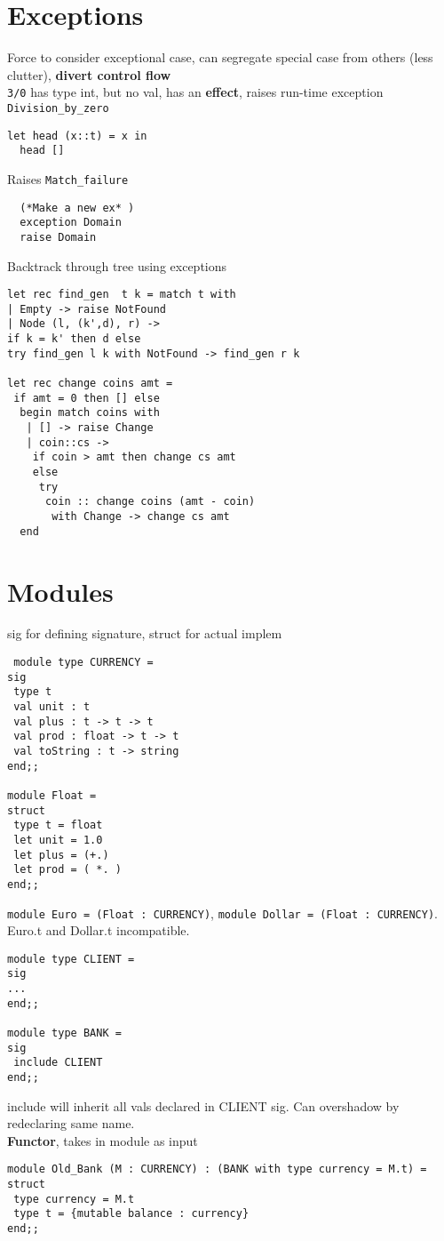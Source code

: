 \section{Exceptions}
Force to consider exceptional case, can segregate special case from
others (less clutter), \textbf{divert control flow}
\\ \texttt{3/0} has type int, but no val, has an \textbf{effect},
raises run-time exception \texttt{Division\_by\_zero}
\begin{lstlisting}
let head (x::t) = x in
  head []
\end{lstlisting}
Raises \texttt{Match\_failure}
\begin{lstlisting}
  (*Make a new ex* )
  exception Domain
  raise Domain
\end{lstlisting}
Backtrack through tree using exceptions
\begin{lstlisting}
let rec find_gen  t k = match t with
| Empty -> raise NotFound
| Node (l, (k',d), r) -> 
if k = k' then d else 
try find_gen l k with NotFound -> find_gen r k

let rec change coins amt = 
 if amt = 0 then [] else 
  begin match coins with 
   | [] -> raise Change
   | coin::cs ->
    if coin > amt then change cs amt
    else 
     try 
      coin :: change coins (amt - coin)
       with Change -> change cs amt
  end
\end{lstlisting}
\color{Emerald}
\section{Modules}
sig for defining signature, struct for actual implem
\begin{lstlisting}
 module type CURRENCY = 
sig 
 type t 
 val unit : t 
 val plus : t -> t -> t 
 val prod : float -> t -> t 
 val toString : t -> string
end;;
  
module Float = 
struct 
 type t = float 
 let unit = 1.0 
 let plus = (+.) 
 let prod = ( *. ) 
end;;

\end{lstlisting}
\texttt{module Euro = (Float : CURRENCY)}, \texttt{module Dollar =
  (Float : CURRENCY)}. Euro.t and Dollar.t incompatible.
\begin{lstlisting}
module type CLIENT =
sig 
...
end;; 

module type BANK =
sig
 include CLIENT
end;;
\end{lstlisting}
include will inherit all vals declared in CLIENT sig. Can overshadow
by redeclaring same name.
\\\textbf{Functor}, takes in module as input
\begin{lstlisting}
module Old_Bank (M : CURRENCY) : (BANK with type currency = M.t) = 
struct 
 type currency = M.t
 type t = {mutable balance : currency}
end;;
\end{lstlisting}
\color{RoyalPurple}
